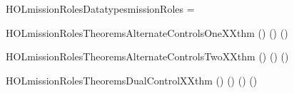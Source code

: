 \newcommand{\HOLmissionRolesDate}{20 August 2016}
\newcommand{\HOLmissionRolesTime}{11:38}
\begin{SaveVerbatim}{HOLmissionRolesDatatypesmissionRoles}
 =  \HOLTokenBar{}  \HOLTokenBar{}  \HOLTokenBar{} 
\end{SaveVerbatim}
\newcommand{\HOLmissionRolesDatatypesmissionRoles}{\UseVerbatim{HOLmissionRolesDatatypesmissionRoles}}
\newcommand{\HOLmissionRolesDatatypes}{
\HOLmissionRolesDatatypesmissionRoles}
\begin{SaveVerbatim}{HOLmissionRolesTheoremsAlternateControlsOneXXthm}
\HOLTokenTurnstile{} (\HOLSymConst{,}\HOLSymConst{,})     \HOLSymConst{\HOLTokenImp{}}
   (\HOLSymConst{,}\HOLSymConst{,})         \HOLSymConst{\HOLTokenImp{}}
   (\HOLSymConst{,}\HOLSymConst{,})  
\end{SaveVerbatim}
\newcommand{\HOLmissionRolesTheoremsAlternateControlsOneXXthm}{\UseVerbatim{HOLmissionRolesTheoremsAlternateControlsOneXXthm}}
\begin{SaveVerbatim}{HOLmissionRolesTheoremsAlternateControlsTwoXXthm}
\HOLTokenTurnstile{} (\HOLSymConst{,}\HOLSymConst{,})     \HOLSymConst{\HOLTokenImp{}}
   (\HOLSymConst{,}\HOLSymConst{,})         \HOLSymConst{\HOLTokenImp{}}
   (\HOLSymConst{,}\HOLSymConst{,})  
\end{SaveVerbatim}
\newcommand{\HOLmissionRolesTheoremsAlternateControlsTwoXXthm}{\UseVerbatim{HOLmissionRolesTheoremsAlternateControlsTwoXXthm}}
\begin{SaveVerbatim}{HOLmissionRolesTheoremsDualControlXXthm}
\HOLTokenTurnstile{} (\HOLSymConst{,}\HOLSymConst{,})     \HOLSymConst{\HOLTokenImp{}}
   (\HOLSymConst{,}\HOLSymConst{,})     \HOLSymConst{\HOLTokenImp{}}
   (\HOLSymConst{,}\HOLSymConst{,})       \HOLSymConst{\HOLTokenImp{}}
   (\HOLSymConst{,}\HOLSymConst{,})  
\end{SaveVerbatim}
